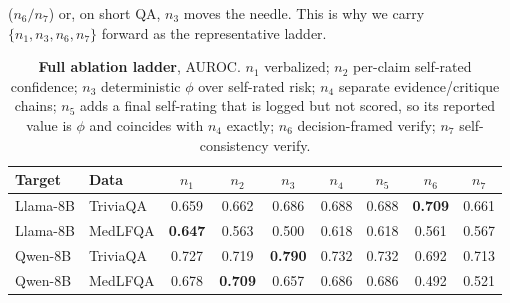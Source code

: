 \documentclass[11pt]{article}
\begin{document}
($n_6/n_7$) or, on short QA, $n_3$ moves the needle. This is why we carry $\{n_1,n_3,n_6,n_7\}$
forward as the representative ladder.
\begin{table}[t]
\centering\small
\setlength{\tabcolsep}{3.5pt}
\begin{tabular}{llccccccc}
\toprule
Target & Data & $n_1$ & $n_2$ & $n_3$ & $n_4$ & $n_5$ & $n_6$ & $n_7$ \\
\midrule
Llama-8B & TriviaQA & 0.659 & 0.662 & 0.686 & 0.688 & 0.688 & \textbf{0.709} & 0.661 \\
Llama-8B & MedLFQA  & \textbf{0.647} & 0.563 & 0.500 & 0.618 & 0.618 & 0.561 & 0.567 \\
Qwen-8B  & TriviaQA & 0.727 & 0.719 & \textbf{0.790} & 0.732 & 0.732 & 0.692 & 0.713 \\
Qwen-8B  & MedLFQA  & 0.678 & \textbf{0.709} & 0.657 & 0.686 & 0.686 & 0.492 & 0.521 \\
\bottomrule
\end{tabular}
\caption{\textbf{Full ablation ladder}, AUROC. $n_1$ verbalized; $n_2$ per-claim self-rated
confidence; $n_3$ deterministic $\phi$ over self-rated risk; $n_4$ separate evidence/critique
chains; $n_5$ adds a final self-rating that is logged but not scored, so its reported value is $\phi$ and coincides with $n_4$ exactly; $n_6$ decision-framed
verify; $n_7$ self-consistency verify.}
\label{tab:ladder}
\end{table}
\end{document}

